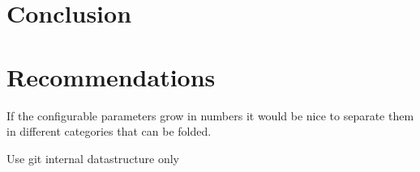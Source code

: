 \chapter{Conclusion}
\chapter{Recommendations}
If the configurable parameters grow in numbers it would be nice to separate them in different categories that can be folded.

Use git internal datastructure only
